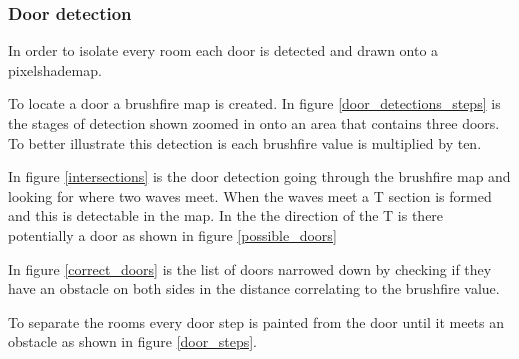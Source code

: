 \subsubsection{Door detection}
In order to isolate every room each door is detected and drawn onto a pixelshademap.

To locate a door a brushfire map is created. 
In figure \ref{door_detections_steps} is the stages of detection shown zoomed in onto an area that contains three doors.
To better illustrate this detection is each brushfire value is multiplied by ten.

In figure \ref{intersections} is the door detection going through the brushfire map and looking for where two waves meet.
When the waves meet a T section is formed and this is detectable in the map. 
In the the direction of the T is there potentially a door as shown in figure \ref{possible_doors}

In figure \ref{correct_doors} is the list of doors narrowed down by checking if they have an obstacle on both sides in the distance correlating to the brushfire value.

To separate the rooms every door step is painted from the door until it meets an obstacle as shown in figure \ref{door_steps}.

